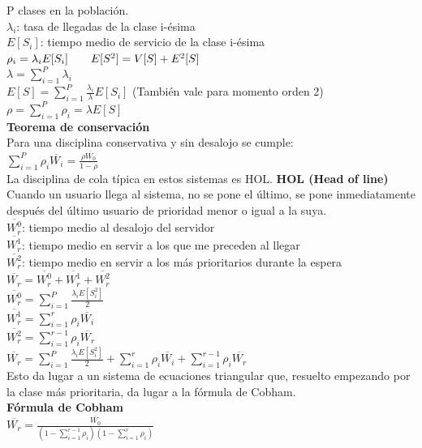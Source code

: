 \begin{minipage}{.22\textwidth}
	P clases en la población. \\
	$\lambda_i$: tasa de llegadas de la clase i-ésima \\
	$E[S_i]$: tiempo medio de servicio de la clase i-ésima \\
	$\rho_i=\lambda_i{E[S_i]} \hskip 2em E[S^2]=V[S]+E^2[S]$ \\
	$\lambda=\sum\limits_{i=1}^P{\lambda_i}$ \\
	$E[S]=\sum_{i=1}^P{\frac{\lambda_i}{\lambda}}E[S_i]$ (También vale para momento orden 2) \\
	$\rho=\sum\limits_{i=1}^P{\rho_i}=\lambda{E[S]}$ \\
	{\bf Teorema de conservación} \\
	Para una disciplina conservativa y sin desalojo se cumple: \\
	$\sum\limits_{i=1}^P{\rho_i}{\overline{W_i}}=\frac{\rho\overline{W_0}}{1-\rho}$ \\
	La disciplina de cola típica en estos sistemas es HOL.
		{\bf HOL (Head of line)} \\
	Cuando un usuario llega al sistema, no se pone el último, se pone inmediatamente después del último usuario de prioridad menor o igual a la suya. \\
	$\overline{W_r^0}$: tiempo medio al desalojo del servidor \\
	$\overline{W_r^1}$: tiempo medio en servir a los que me preceden al llegar \\
	$\overline{W_r^2}$: tiempo medio en servir a los más prioritarios durante la espera \\
	$\overline{W_r}=\overline{W_r^0}+\overline{W_r^1}+\overline{W_r^2}$ \\
	$\overline{W_r^0}=\sum\limits_{i=1}^P\frac{\lambda_i{E[S_i^2]}}{2}$ \\
	$\overline{W_r^1} =\sum\limits_{i=1}^r{\rho_i \overline{W_i}}$ \\
	$\overline{W_r^2} =\sum\limits_{i=1}^{r-1}{\rho_i \overline{W_r}}$ \\
	$\overline{W_r}=\sum\limits_{i=1}^P\frac{\lambda_i{E[S_i^2]}}{2}+\sum\limits_{i=1}^r{\rho_i \overline{W_i}}+\sum\limits_{i=1}^{r-1}{\rho_i \overline{W_r}}$ \\
	Esto da lugar a un sistema de ecuaciones triangular que, resuelto empezando por la clase más prioritaria, da lugar a la fórmula de Cobham.\\
	{\bf Fórmula de Cobham} \\
	$\overline{W_r}=\frac{\overline{W_0}}{(1-\sum_{i=1}^{r-1}{\rho_i})(1-\sum_{i=1}^{r}{\rho_i})}$ \\
\end{minipage}

